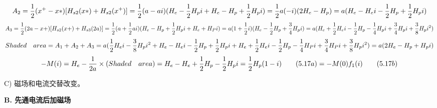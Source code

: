 \begin{equation}%
A_{2}=\frac{1}{2}(x^{+}-x*)[H_{s2}(x*)+H_{s2}(x^{+})]\\
=\frac{1}{2}(a-ai)(H_{e}-\frac{1}{2}H_{p}i+H_{e}-H_{p}+\frac{1}{2}H_{p}i)\\
=\frac{1}{2}a(-i)(2H_{e}-H_{p})\\
=a(H_{e}-H_{e}i-\frac{1}{2}H_{p}+\frac{1}{2}H_{p}i)
\end{equation}
\begin{equation}%
A_{3}=\frac{1}{2}(2a-x+)[H_{s2}(x+)+H_{s3}(2a)]\\
=\frac{1}{2}(a+\frac{1}{2}ai)(H_{e}-H_{p}+\frac{1}{2}H_{p}i+H_{e}+H_{P}i)\\
=a(1+\frac{1}{2}i)(H_{e}-\frac{1}{2}H_{p}+\frac{3}{4}H_{p}i)\\
=a(H_{e}+\frac{1}{2}H_{e}i-\frac{1}{2}H_{p}-\frac{1}{4}H_{p}i+\frac{3}{4}H_{p}i+\frac{3}{8}H_{p}i^{2})
\end{equation}
\begin{equation}%
Shaded\quad area=A_{1}+A_{2}+A_{3}\\
=a(\frac{1}{2}H_{e}i-\frac{3}{8}H_{p}i^{2}+H_{e}-H_{e}i-\frac{1}{2}H_{p}+\frac{1}{2}H_{p}i\\
+H_{e}+\frac{1}{2}H_{e}i-\frac{1}{2}H_{p}-\frac{1}{4}H_{P}i+\frac{3}{4}H_{P}i+\frac{3}{8}H_{p}i^{2})\\
=a(2H_{e}-H_{p}+H_{p}i)
\end{equation}
\begin{equation}%
-M(i)=H_{e}-\frac{1}{2a}\times(Shaded\quad area)\\
=H_{e}-H_{e}+\frac{1}{2}H_{p}-\frac{1}{2}H_{p}i\\
=\frac{1}{2}H_{p}(1-i)\qquad(5.17a)\\
=-M(0)f_{1}(i)\qquad(5.17b)
\end{equation}

C) 磁场和电流交替改变。

\textbf{B. 先通电流后加磁场}


